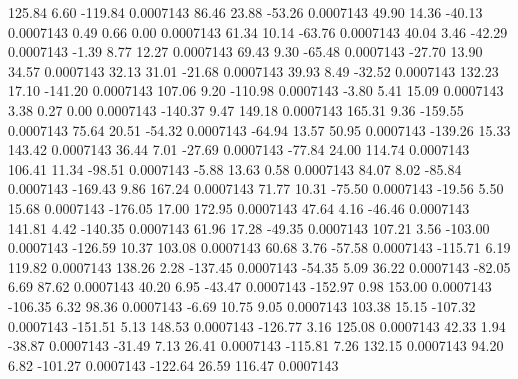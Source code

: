       125.84        6.60     -119.84     0.0007143
       86.46       23.88      -53.26     0.0007143
       49.90       14.36      -40.13     0.0007143
        0.49        0.66        0.00     0.0007143
       61.34       10.14      -63.76     0.0007143
       40.04        3.46      -42.29     0.0007143
       -1.39        8.77       12.27     0.0007143
       69.43        9.30      -65.48     0.0007143
      -27.70       13.90       34.57     0.0007143
       32.13       31.01      -21.68     0.0007143
       39.93        8.49      -32.52     0.0007143
      132.23       17.10     -141.20     0.0007143
      107.06        9.20     -110.98     0.0007143
       -3.80        5.41       15.09     0.0007143
        3.38        0.27        0.00     0.0007143
     -140.37        9.47      149.18     0.0007143
      165.31        9.36     -159.55     0.0007143
       75.64       20.51      -54.32     0.0007143
      -64.94       13.57       50.95     0.0007143
     -139.26       15.33      143.42     0.0007143
       36.44        7.01      -27.69     0.0007143
      -77.84       24.00      114.74     0.0007143
      106.41       11.34      -98.51     0.0007143
       -5.88       13.63        0.58     0.0007143
       84.07        8.02      -85.84     0.0007143
     -169.43        9.86      167.24     0.0007143
       71.77       10.31      -75.50     0.0007143
      -19.56        5.50       15.68     0.0007143
     -176.05       17.00      172.95     0.0007143
       47.64        4.16      -46.46     0.0007143
      141.81        4.42     -140.35     0.0007143
       61.96       17.28      -49.35     0.0007143
      107.21        3.56     -103.00     0.0007143
     -126.59       10.37      103.08     0.0007143
       60.68        3.76      -57.58     0.0007143
     -115.71        6.19      119.82     0.0007143
      138.26        2.28     -137.45     0.0007143
      -54.35        5.09       36.22     0.0007143
      -82.05        6.69       87.62     0.0007143
       40.20        6.95      -43.47     0.0007143
     -152.97        0.98      153.00     0.0007143
     -106.35        6.32       98.36     0.0007143
       -6.69       10.75        9.05     0.0007143
      103.38       15.15     -107.32     0.0007143
     -151.51        5.13      148.53     0.0007143
     -126.77        3.16      125.08     0.0007143
       42.33        1.94      -38.87     0.0007143
      -31.49        7.13       26.41     0.0007143
     -115.81        7.26      132.15     0.0007143
       94.20        6.82     -101.27     0.0007143
     -122.64       26.59      116.47     0.0007143
